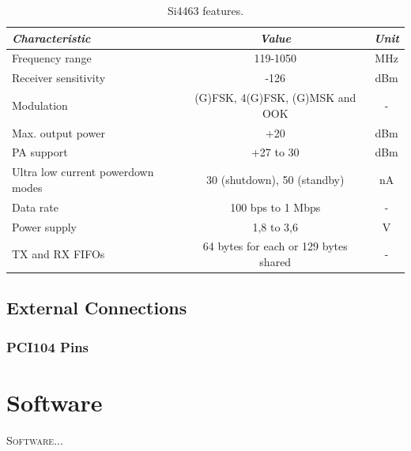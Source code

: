 \documentclass[12pt]{book}
\begin{document}
\begin{table}[!h]
	\begin{center}
		\begin{tabular}{lcc}
			\toprule[1.5pt]
			\textit{Characteristic} & \textit{Value} & \textit{Unit} \\
			\midrule
			Frequency range & 119-1050 & MHz \\
			Receiver sensitivity & -126 & dBm \\
			Modulation & (G)FSK, 4(G)FSK, (G)MSK and OOK & - \\
			Max. output power & +20 & dBm \\
			PA support & +27 to 30 & dBm \\
			Ultra low current powerdown modes & 30 (shutdown), 50 (standby) & nA \\
			Data rate & 100 bps to 1 Mbps & - \\
			Power supply & 1,8 to 3,6 & V \\
			TX and RX FIFOs & 64 bytes for each or 129 bytes shared & - \\
			\bottomrule[1.5pt]
		\end{tabular}
		\caption{Si4463 features.}
		\label{tab:si4463-info}
	\end{center}
\end{table}

\section{External Connections}



\subsection{PCI104 Pins}




\chapter{Software}

\lettrine{S}{oftware}...

\end{document}
